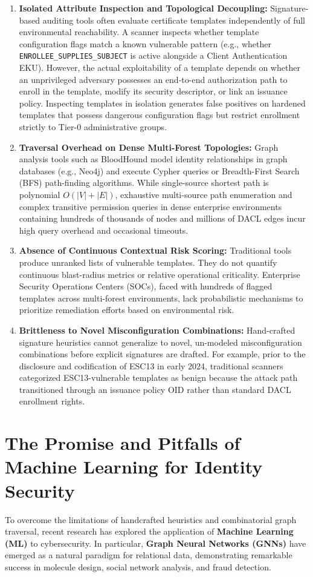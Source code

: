 \begin{enumerate}
    \item \textbf{Isolated Attribute Inspection and Topological Decoupling:} Signature-based auditing tools often evaluate certificate templates independently of full environmental reachability. A scanner inspects whether template configuration flags match a known vulnerable pattern (e.g., whether \texttt{ENROLLEE\_SUPPLIES\_SUBJECT} is active alongside a Client Authentication EKU). However, the actual exploitability of a template depends on whether an unprivileged adversary possesses an end-to-end authorization path to enroll in the template, modify its security descriptor, or link an issuance policy. Inspecting templates in isolation generates false positives on hardened templates that possess dangerous configuration flags but restrict enrollment strictly to Tier-0 administrative groups.
    \item \textbf{Traversal Overhead on Dense Multi-Forest Topologies:} Graph analysis tools such as BloodHound model identity relationships in graph databases (e.g., Neo4j) and execute Cypher queries or Breadth-First Search (BFS) path-finding algorithms. While single-source shortest path is polynomial $O(|V| + |E|)$, exhaustive multi-source path enumeration and complex transitive permission queries in dense enterprise environments containing hundreds of thousands of nodes and millions of DACL edges incur high query overhead and occasional timeouts.
    \item \textbf{Absence of Continuous Contextual Risk Scoring:} Traditional tools produce unranked lists of vulnerable templates. They do not quantify continuous blast-radius metrics or relative operational criticality. Enterprise Security Operations Centers (SOCs), faced with hundreds of flagged templates across multi-forest environments, lack probabilistic mechanisms to prioritize remediation efforts based on environmental risk.
    \item \textbf{Brittleness to Novel Misconfiguration Combinations:} Hand-crafted signature heuristics cannot generalize to novel, un-modeled misconfiguration combinations before explicit signatures are drafted. For example, prior to the disclosure and codification of ESC13 in early 2024, traditional scanners categorized ESC13-vulnerable templates as benign because the attack path transitioned through an issuance policy OID rather than standard DACL enrollment rights.
\end{enumerate}

\section{The Promise and Pitfalls of Machine Learning for Identity Security}
To overcome the limitations of handcrafted heuristics and combinatorial graph traversal, recent research has explored the application of \textbf{Machine Learning (ML)} to cybersecurity. In particular, \textbf{Graph Neural Networks (GNNs)} have emerged as a natural paradigm for relational data, demonstrating remarkable success in molecule design, social network analysis, and fraud detection.

